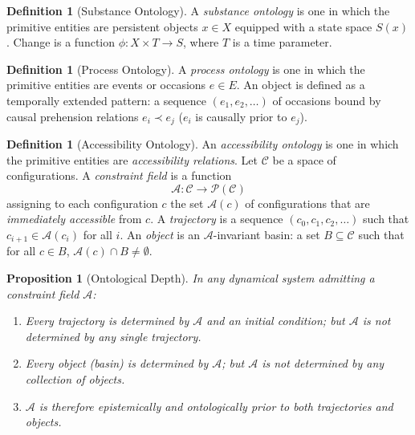 \documentclass[12pt, a4paper, twoside]{article}
\theoremstyle{plain}
\newtheorem{proposition}[theorem]{Proposition}
\theoremstyle{definition}
\newtheorem{definition}[theorem]{Definition}
\theoremstyle{remark}
\newcommand{\Acc}{\mathcal{A}}
\newcommand{\Conf}{\mathcal{C}}
\begin{document}
\begin{definition}[Substance Ontology]
A \emph{substance ontology} is one in which the primitive entities are
persistent objects $x \in X$ equipped with a state space $S(x)$.
Change is a function $\phi: X \times T \to S$, where $T$ is a time parameter.
\end{definition}

\begin{definition}[Process Ontology]
A \emph{process ontology} is one in which the primitive entities are events or
occasions $e \in E$. An object is defined as a temporally extended pattern:
a sequence $(e_1, e_2, \ldots)$ of occasions bound by causal prehension
relations $e_i \prec e_j$ ($e_i$ is causally prior to $e_j$).
\end{definition}

\begin{definition}[Accessibility Ontology]
\label{def:acc_ontology}
An \emph{accessibility ontology} is one in which the primitive entities are
\emph{accessibility relations}. Let $\Conf$ be a space of configurations.
A \emph{constraint field} is a function
\[
  \Acc: \Conf \to \mathcal{P}(\Conf)
\]
assigning to each configuration $c$ the set $\Acc(c)$ of configurations that
are \emph{immediately accessible} from $c$. A \emph{trajectory} is a sequence
$(c_0, c_1, c_2, \ldots)$ such that $c_{i+1} \in \Acc(c_i)$ for all $i$.
An \emph{object} is an $\Acc$-invariant basin: a set $B \subseteq \Conf$ such
that for all $c \in B$, $\Acc(c) \cap B \neq \emptyset$.
\end{definition}

\begin{proposition}[Ontological Depth]
\label{prop:hierarchy}
In any dynamical system admitting a constraint field $\Acc$:
\begin{enumerate}[label=(\roman*)]
  \item Every trajectory is determined by $\Acc$ and an initial condition;
        but $\Acc$ is not determined by any single trajectory.
  \item Every object (basin) is determined by $\Acc$; but $\Acc$ is not
        determined by any collection of objects.
  \item $\Acc$ is therefore epistemically and ontologically prior to both
        trajectories and objects.
\end{enumerate}
\end{proposition}
\end{document}
